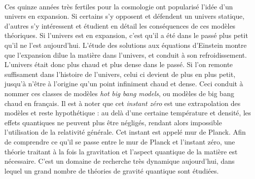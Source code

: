 \paragraph{}
Ces quinze années très fertiles pour la cosmologie ont popularisé l'idée d'un univers en expansion. Si certains s'y opposent et défendent un univers statique, d'autres s'y intéressent et étudient en détail les conséquences de ces modèles théoriques. Si l'univers est en expansion, c'est qu'il a été dans le passé plus petit qu'il ne l'est aujourd'hui. L'étude des solutions aux équations d'Einstein montre que l'expansion dilue la matière dans l'univers, et conduit à son refroidissement. L'univers était donc plus chaud et plus dense dans le passé. Si l'on remonte suffisament dans l'histoire de l'univers, celui ci devient de plus en plus petit, jusqu'à n'être à l'origine qu'un point infiniment chaud et dense. Ceci conduit à nommer ces classes de modèles \emph{hot big bang models}, ou modèles de big bang chaud en français. Il est à noter que cet \emph{instant zéro} est une extrapolation des modèles et reste hypothétique : au delà d'une certaine température et densité, les effets quantiques ne peuvent plus être négligés, rendant alors impossible l'utilisation de la relativité générale. Cet instant est appelé mur de Planck. Afin de comprendre ce qu'il se passe entre le mur de Planck et l'instant zéro, une théorie traitant à la fois la gravitation et l'aspect quantique de la matière est nécessaire. C'est un domaine de recherche très dynamique aujourd'hui, dans lequel un grand nombre de théories de gravité quantique sont étudiées.

